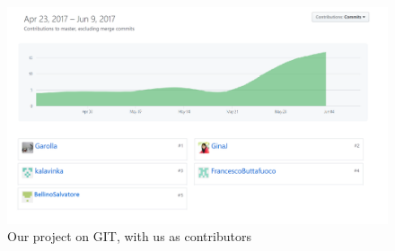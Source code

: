 \begin{figure}[h!]
	\centering	
	\includegraphics[width=\textwidth]{chapters/git.png}  
	\caption{Our project on GIT, with us as contributors} 
	\label{git}
\end{figure}	

